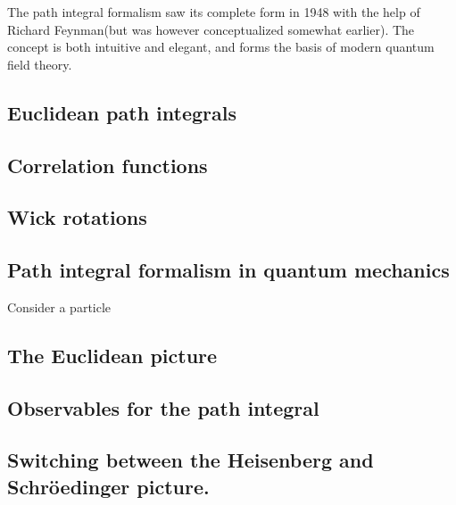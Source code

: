 The path integral formalism saw its complete form in 1948 with the help of Richard Feynman\cite{RevModPhys.20.367}(but was however conceptualized somewhat earlier). The concept is both intuitive and elegant, and forms the basis of modern quantum field theory. 

\subsection{Euclidean path integrals}

\subsection{Correlation functions}

\subsection{Wick rotations} %

\subsection{Path integral formalism in quantum mechanics}
Consider a particle 

\subsection{The Euclidean picture}

\subsection{Observables for the path integral}

\subsection{Switching between the Heisenberg and Schröedinger picture.}





